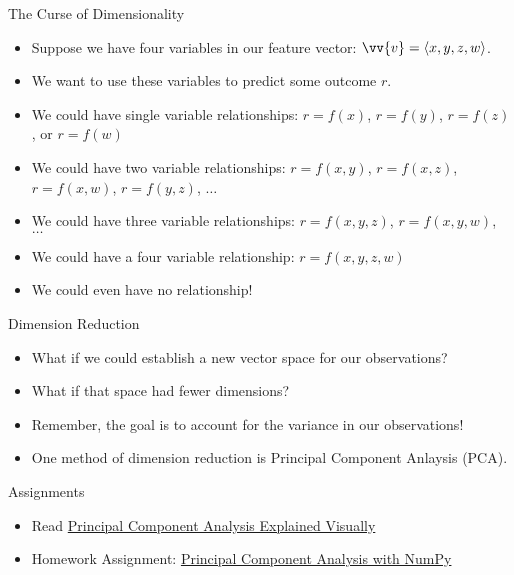 \documentclass[handout]{beamer}
\begin{document}
\begin{frame}{The Curse of Dimensionality}
    \begin{itemize}
        \item Suppose we have four variables in our feature vector: $\vv{v} = \langle x, y, z, w \rangle$.
        \item We want to use these variables to predict some outcome $r$.
        \item We could have single variable relationships:
            $r = f(x)$, $r=f(y)$, $r=f(z)$, or $r=f(w)$
        \item We could have two variable relationships:
            $r = f(x, y)$, $r = f(x, z)$, $r = f(x, w)$, $r = f(y, z)$, $\ldots$
        \item We could have three variable relationships:
            $r = f(x, y, z)$, $r=f(x, y, w)$, $\ldots$
        \item We could have a four variable relationship:
            $r = f(x, y, z, w)$
        \item We could even have no relationship! 
    \end{itemize}
\end{frame}

\begin{frame}{Dimension Reduction}
    \begin{itemize}
        \item What if we could establish a new vector space for our observations?
        \item What if that space had fewer dimensions?
        \item Remember, the goal is to account for the variance in our observations!
        \item One method of dimension reduction is Principal Component Anlaysis (PCA).
    \end{itemize}
\end{frame}

\begin{frame}{Assignments}
    \begin{itemize}
        \item Read \href{https://setosa.io/ev/principal-component-analysis/}{Principal Component Analysis Explained Visually}
        \item Homework Assignment: \href{https://canvas.semo.edu/courses/8742/assignments/82308}{Principal Component Analysis with NumPy}
    \end{itemize}
\end{frame}
\end{document}
